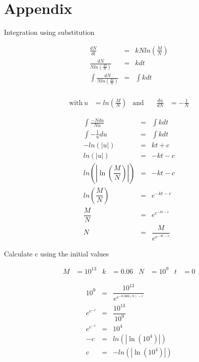 \chapter{Appendix}

Integration using substitution

\begin{eqnarray*}
\frac{dN}{dt}                                &=& kNln\left(\frac{M}{N} \right) \\
\frac{dN}{Nln\left(\frac{M}{N} \right)}      &=& kdt \\
\int \frac{dN}{Nln\left(\frac{M}{N} \right)} &=& \int kdt \\
\end{eqnarray*}

\begin{align*}
\text{with}\ u &= ln\left(\frac{M}{N} \right) & \text{and}\ && \frac{du}{dN} &= -\frac{1}{N}
\end{align*}

\begin{eqnarray*}
\int \frac{-Ndu}{Nu} &=& \int kdt \\
\int -\frac{1}{u}du &=& \int kdt \\
-ln\left(|{u}| \right) &=& kt + c \\
ln\left(|{u}| \right) &=& -kt - c \\
ln\left(\left|\ln\left(\dfrac{M}{N}\right)\right|\right) &=& -kt - c \\
ln\left(\dfrac{M}{N}\right) &=& e^{-kt - c} \\
\dfrac{M}{N}                &=& e^{e^{-kt - c}} \\
N                           &=& \dfrac{M}{e^{e^{-kt - c}}}
\end{eqnarray*}

\clearpage

Calculate c using the initial values

\begin{align*}
    M &= 10^{13} & k &= 0.06 & N &= 10^9 & t &= 0
\end{align*}

\begin{eqnarray*}
10^9        &=& \dfrac{10^{13}}{e^{e^{-0.006(0) - c}}} \\
e^{e^{-c}}  &=& \dfrac{10^{13}}{10^9} \\
e^{e^{-c}}  &=& {10^4} \\
-c          &=& ln\left(\left|\ln\left({10^4}\right)\right|\right) \\
c           &=& -ln\left(\left|\ln\left({10^4}\right)\right|\right) \\
\end{eqnarray*}


